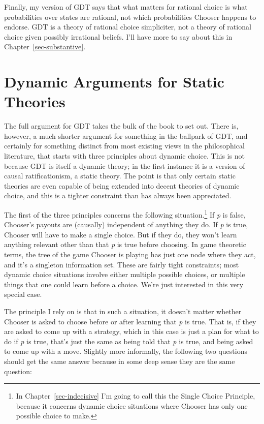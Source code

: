 \documentclass[
  12pt,
  letterpaper,
  DIV=11,
  numbers=noendperiod]{scrreprt}
\begin{document}
Finally, my version of GDT says that what matters for rational choice is
what probabilities over states are rational, not which probabilities
Chooser happens to endorse. GDT is a theory of rational choice
simpliciter, not a theory of rational choice given possibly irrational
beliefs. I'll have more to say about this in
Chapter~\ref{sec-substantive}.

\section{Dynamic Arguments for Static Theories}\label{sec-dynamic-argue}

The full argument for GDT takes the bulk of the book to set out. There
is, however, a much shorter argument for something in the ballpark of
GDT, and certainly for something distinct from most existing views in
the philosophical literature, that starts with three principles about
dynamic choice. This is not because GDT is itself a dynamic theory; in
the first instance it is a version of causal ratificationism, a static
theory. The point is that only certain static theories are even capable
of being extended into decent theories of dynamic choice, and this is a
tighter constraint than has always been appreciated.

The first of the three principles concerns the following
situation.\footnote{In Chapter~\ref{sec-indecisive} I'm going to call
  this the Single Choice Principle, because it concerns dynamic choice
  situations where Chooser has only one possible choice to make.} If
\emph{p} is false, Chooser's payouts are (causally) independent of
anything they do. If \emph{p} is true, Chooser will have to make a
single choice. But if they do, they won't learn anything relevant other
than that \emph{p} is true before choosing. In game theoretic terms, the
tree of the game Chooser is playing has just one node where they act,
and it's a singleton information set. These are fairly tight
constraints; most dynamic choice situations involve either multiple
possible choices, or multiple things that one could learn before a
choice. We're just interested in this very special case.

The principle I rely on is that in such a situation, it doesn't matter
whether Chooser is asked to choose before or after learning that
\emph{p} is true. That is, if they are asked to come up with a strategy,
which in this case is just a plan for what to do if \emph{p} is true,
that's just the same as being told that \emph{p} is true, and being
asked to come up with a move. Slightly more informally, the following
two questions should get the same answer because in some deep sense they
are the same question:
\end{document}
